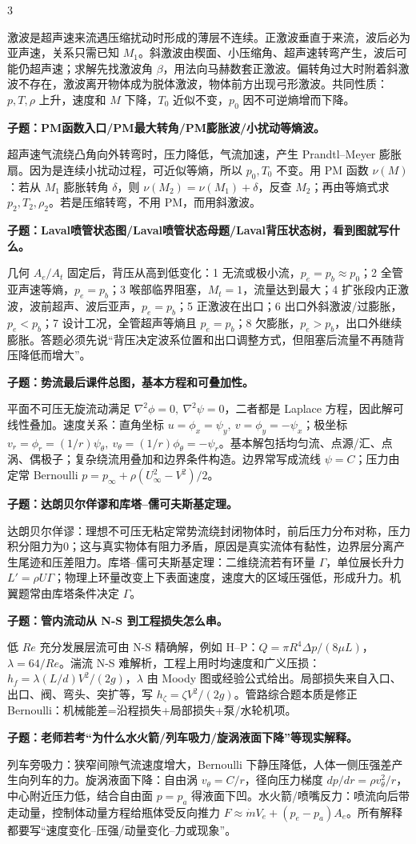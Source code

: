 \documentclass[a4paper]{article}
\newcommand{\qt}[1]{\vspace{0.04pt}\colorbox{Q}{\parbox{\dimexpr\linewidth-2\fboxsep}{\color{white}\bfseries #1}}\par}
\newcommand{\ans}[1]{\colorbox{G}{\parbox{\dimexpr\linewidth-2\fboxsep}{#1}}\par}
\begin{document}
\begin{multicols}{3}
\ans{激波是超声速来流遇压缩扰动时形成的薄层不连续。正激波垂直于来流，波后必为亚声速，关系只需已知 $M_1$。斜激波由楔面、小压缩角、超声速转弯产生，波后可能仍超声速；求解先找激波角 $\beta$，用法向马赫数套正激波。偏转角过大时附着斜激波不存在，激波离开物体成为脱体激波，物体前方出现弓形激波。共同性质：$p,T,\rho$ 上升，速度和 $M$ 下降，$T_0$ 近似不变，$p_0$ 因不可逆熵增而下降。}
\qt{子题：PM函数入口/PM最大转角/PM膨胀波/小扰动等熵波。}
\ans{超声速气流绕凸角向外转弯时，压力降低，气流加速，产生 Prandtl--Meyer 膨胀扇。因为是连续小扰动过程，可近似等熵，所以 $p_0,T_0$ 不变。用 PM 函数 $\nu(M)$：若从 $M_1$ 膨胀转角 $\delta$，则 $\nu(M_2)=\nu(M_1)+\delta$，反查 $M_2$；再由等熵式求 $p_2,T_2,\rho_2$。若是压缩转弯，不用 PM，而用斜激波。}
\qt{子题：Laval喷管状态图/Laval喷管状态母题/Laval背压状态树，看到图就写什么。}
\ans{几何 $A_e/A_t$ 固定后，背压从高到低变化：1 无流或极小流，$p_e=p_b\approx p_0$；2 全管亚声速等熵，$p_e=p_b$；3 喉部临界阻塞，$M_t=1$，流量达到最大；4 扩张段内正激波，波前超声、波后亚声，$p_e=p_b$；5 正激波在出口；6 出口外斜激波/过膨胀，$p_e<p_b$；7 设计工况，全管超声等熵且 $p_e=p_b$；8 欠膨胀，$p_e>p_b$，出口外继续膨胀。答题必须先说“背压决定波系位置和出口调整方式，但阻塞后流量不再随背压降低而增大”。}
\qt{子题：势流最后课件总图，基本方程和可叠加性。}
\ans{平面不可压无旋流动满足 $\nabla^2\phi=0,\ \nabla^2\psi=0$，二者都是 Laplace 方程，因此解可线性叠加。速度关系：直角坐标 $u=\phi_x=\psi_y,\ v=\phi_y=-\psi_x$；极坐标 $v_r=\phi_r=(1/r)\psi_\theta,\ v_\theta=(1/r)\phi_\theta=-\psi_r$。基本解包括均匀流、点源/汇、点涡、偶极子；复杂绕流用叠加和边界条件构造。边界常写成流线 $\psi=C$；压力由定常 Bernoulli $p=p_\infty+\rho(U_\infty^2-V^2)/2$。}
\qt{子题：达朗贝尔佯谬和库塔--儒可夫斯基定理。}
\ans{达朗贝尔佯谬：理想不可压无粘定常势流绕封闭物体时，前后压力分布对称，压力积分阻力为0；这与真实物体有阻力矛盾，原因是真实流体有黏性，边界层分离产生尾迹和压差阻力。库塔--儒可夫斯基定理：二维绕流若有环量 $\Gamma$，单位展长升力 $L'=\rho U\Gamma$；物理上环量改变上下表面速度，速度大的区域压强低，形成升力。机翼题常由库塔条件决定 $\Gamma$。}
\qt{子题：管内流动从 N-S 到工程损失怎么串。}
\ans{低 $Re$ 充分发展层流可由 N-S 精确解，例如 H--P：$Q=\pi R^4\Delta p/(8\mu L)$，$\lambda=64/Re$。湍流 N-S 难解析，工程上用时均速度和广义压损：$h_f=\lambda(L/d)V^2/(2g)$，$\lambda$ 由 Moody 图或经验公式给出。局部损失来自入口、出口、阀、弯头、突扩等，写 $h_\zeta=\zeta V^2/(2g)$。管路综合题本质是修正 Bernoulli：机械能差=沿程损失+局部损失+泵/水轮机项。}
\qt{子题：老师若考“为什么水火箭/列车吸力/旋涡液面下降”等现实解释。}
\ans{列车旁吸力：狭窄间隙气流速度增大，Bernoulli 下静压降低，人体一侧压强差产生向列车的力。旋涡液面下降：自由涡 $v_\theta=C/r$，径向压力梯度 $dp/dr=\rho v_\theta^2/r$，中心附近压力低，结合自由面 $p=p_a$ 得液面下凹。水火箭/喷嘴反力：喷流向后带走动量，控制体动量方程给瓶体受反向推力 $F\approx\dot m V_e+(p_e-p_a)A_e$。所有解释都要写“速度变化--压强/动量变化--力或现象”。}

\end{multicols}
\end{document}
